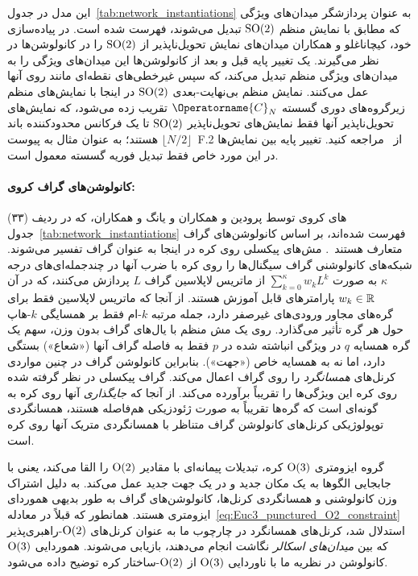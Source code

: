 این مدل در جدول~\ref{tab:network_instantiations} به عنوان پردازشگر میدان‌های ویژگی که مطابق با نمایش منظم $\operatorname{SO}(2)$ تبدیل می‌شوند، فهرست شده است.
در پیاده‌سازی خود، کیچاناغلو و همکاران\cite{kicanaoglu2019gaugeSphere} میدان‌های نمایش تحویل‌ناپذیر از $\operatorname{SO}(2)$ را در کانولوشن‌ها در نظر می‌گیرند.
یک تغییر پایه قبل و بعد از کانولوشن‌ها این میدان‌های ویژگی را به میدان‌های ویژگی منظم تبدیل می‌کند، که سپس غیرخطی‌های نقطه‌ای مانند  روی آنها عمل می‌کنند.
نمایش منظم بی‌نهایت-بعدی $\operatorname{SO}(2)$ در اینجا با نمایش‌های منظم زیرگروه‌های دوری گسسته $\Operatorname{C}_N$ تقریب زده می‌شود، که نمایش‌های تحویل‌ناپذیر آنها فقط نمایش‌های تحویل‌ناپذیر $\operatorname{SO}(2)$ تا یک فرکانس محدودکننده باند $\lfloor N/2 \rfloor$ هستند؛ به عنوان مثال به پیوست~F.2 از~\cite{Weiler2019_E2CNN} مراجعه کنید.
تغییر پایه بین نمایش‌ها در این مورد خاص فقط تبدیل فوریه گسسته معمول است.


\paragraph{کانولوشن‌های گراف کروی:}

های کروی توسط \cite{perraudin2018DeepSphere} پرودین و همکاران و \cite{yang2020rotation} یانگ و همکاران، که در ردیف (۳۳) جدول~\ref{tab:network_instantiations} فهرست شده‌اند، بر اساس کانولوشن‌های گراف متعارف هستند~\cite{kipf2016semi}.
مش‌های پیکسلی روی کره در اینجا به عنوان گراف تفسیر می‌شوند.
شبکه‌های کانولوشنی گراف سیگنال‌ها را روی کره با ضرب آنها در چندجمله‌ای‌های درجه $\kappa$ به صورت $\sum_{k=0}^\kappa w_k L^k$ از ماتریس لاپلاسین گراف $L$ پردازش می‌کنند، که در آن $w_k \in \mathbb{R}$ پارامترهای قابل آموزش هستند.
از آنجا که ماتریس لاپلاسین فقط برای گره‌های مجاور ورودی‌های غیرصفر دارد، جمله مرتبه $k$-ام فقط بر همسایگی $k$-هاپ حول هر گره تأثیر می‌گذارد.
روی یک مش منظم با یال‌های گراف بدون وزن، سهم یک گره همسایه $q$ در ویژگی انباشته شده در $p$ فقط به فاصله گراف آنها («شعاع») بستگی دارد، اما نه به همسایه خاص («جهت»).
بنابراین کانولوشن گراف در چنین مواردی کرنل‌های \emph{همسانگرد} را روی گراف اعمال می‌کند.
گراف پیکسلی در نظر گرفته شده روی کره این ویژگی‌ها را تقریباً برآورده می‌کند.
از آنجا که \emph{جایگذاری} آنها روی کره به گونه‌ای است که گره‌ها تقریباً به صورت ژئودزیکی هم‌فاصله هستند، همسانگردی توپولوژیکی کرنل‌های کانولوشن گراف متناظر با همسانگردی متریک آنها روی کره است.


گروه ایزومتری $\operatorname{O}(3)$ کره، تبدیلات پیمانه‌ای با مقادیر $\operatorname{O}(2)$ را القا می‌کند، یعنی با جابجایی الگوها به یک مکان جدید و در یک جهت جدید عمل می‌کند.
به دلیل اشتراک وزن کانولوشنی و همسانگردی کرنل‌ها، کانولوشن‌های گراف به طور بدیهی هموردای ایزومتری هستند.
همانطور که قبلاً در معادله~\eqref{eq:Euc3_punctured_O2_constraint} استدلال شد، کرنل‌های همسانگرد در چارچوب ما به عنوان کرنل‌های $\operatorname{O}(2)$-راهبری‌پذیر که بین \emph{میدان‌های اسکالر} نگاشت انجام می‌دهند، بازیابی می‌شوند.
هموردایی $\operatorname{O}(3)$ کانولوشن در نظریه ما با ناوردایی $\operatorname{O}(3)$ از $\operatorname{O}(2)$-ساختار کره توضیح داده می‌شود.


